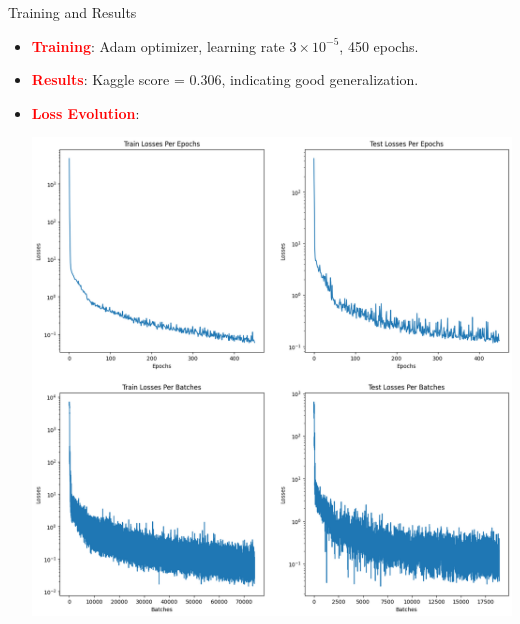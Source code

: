 \documentclass[10pt]{beamer}
\begin{document}
\begin{frame}{Training and Results}
  \begin{itemize}
    \item \textcolor{red}{\textbf{Training}}: Adam optimizer, learning rate \( 3 \times 10^{-5} \), 450 epochs.
    \item \textcolor{red}{\textbf{Results}}: Kaggle score = 0.306, indicating good generalization.
    \item \textcolor{red}{\textbf{Loss Evolution}}:
      \begin{center}
        \includegraphics[width=0.6\linewidth]{Images_Ayoub/Training/Transformers/V2/Losses/First_450_Epochs/Loss.png}
      \end{center}
    
  \end{itemize}
\end{frame}
\end{document}
